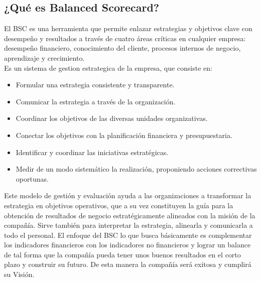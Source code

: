 \documentclass[%
 reprint,
 amsmath,amssymb,
 aps,
]{revtex4-1}
\begin{document}
\subsection{¿Qué es Balanced Scorecard?}
El BSC es una herramienta que permite enlazar estrategias y objetivos clave con desempeño y resultados a través de cuatro áreas críticas en cualquier empresa: desempeño financiero, conocimiento del cliente, procesos internos de negocio, aprendizaje y crecimiento. \cite{da}\\
Es un sistema de gestion estrategica de la empresa, que consiste en:
\begin{itemize}
\item Formular una estrategia consistente y transparente. \\
\item Comunicar la estrategia a través de la organización.  \\
\item Coordinar los objetivos de las diversas unidades organizativas.  \\
\item Conectar los objetivos con la planificación financiera y presupuestaria. \\
\item Identificar y coordinar las iniciativas estratégicas. \\
\item Medir de un modo sistemático la realización, proponiendo acciones correctivas oportunas.  \\
\end{itemize}

Este modelo de gestión y evaluación ayuda a las organizaciones a transformar la estrategia en objetivos operativos, que a su vez constituyen la guía para la
obtención de resultados de negocio estratégicamente alineados con la misión de la compañía. Sirve también para interpretar la estrategia, alinearla y comunicarla a todo el personal. El enfoque del BSC lo que busca básicamente es complementar los indicadores financieros con los indicadores no financieros y lograr un balance de tal forma que la compañía pueda tener unos buenos resultados en el corto plazo y construir su futuro. De esta manera la compañía será exitosa y cumplirá su Visión. 
\end{document}
